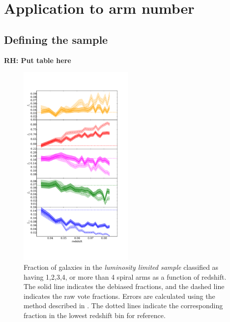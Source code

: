 \documentclass[useAMS,usenatbib]{mn2e}
\newcommand{\rh}[1]{{\bf \textcolor{RoyalPurple}{RH: #1}}}
\begin{document}
\section{Application to arm number}
\label{sec:results}


\subsection{Defining the sample}

\rh{Put table here}

\begin{figure}
		\centering

        \includegraphics[width=0.5\textwidth]{Data_imgs/redshift_plot.pdf}

        \caption{Fraction of galaxies in the \textit{luminosity limited sample} classified as having 1,2,3,4, or more than 4 spiral arms as a function of redshift. The solid line indicates the debiased fractions, and the dashed line indicates the raw vote fractions. Errors are calculated using the method described in \citet{Cameron_11}. The dotted lines indicate the corresponding fraction in the lowest redshift bin for reference.}

        \label{fig:arm_number_trend}

\end{figure}
\end{document}
